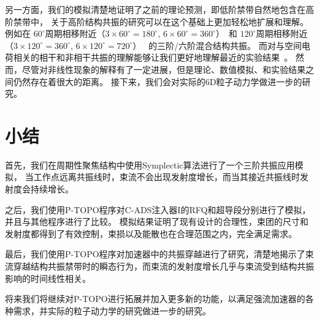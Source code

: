 另一方面，我们的模拟清楚地证明了之前的理论预测，即低阶禁带自然地包含在高阶禁带中，
关于高阶结构共振的研究可以在这个基础上更加轻松地扩展和理解。
例如在 $60^{\circ}$周期相移附近（$3 \times 60^{\circ} = 180^{\circ}$, $6 \times 60^{\circ} = 360^{\circ}$）~\cite{16}和 $120^{\circ}$周期相移附近（$3 \times 120^{\circ} = 360^{\circ}$, $6 \times 120^{\circ} = 720^{\circ}$）~\cite{11,36}
的三阶/六阶混合结构共振。
而对与空间电荷相关的相干和非相干共振的理解能够让我们更好地理解最近的实验结果~\cite{31,32,33}。
然而，尽管对非线性现象的解释有了一定进展，但是理论、数值模拟、和实验结果之间仍然存在着很大的距离。
接下来，我们会对实际的6D粒子动力学做进一步的研究。

\section{小结}                    \label{section:Simulation_conclusion}
首先，我们在周期性聚焦结构中使用Symplectic算法进行了一个三阶共振应用模拟，
当工作点远离共振线时，束流不会出现发射度增长，而当其接近共振线时发射度会持续增长。

之后，我们使用P-TOPO程序对C-ADS注入器I的RFQ和超导段分别进行了模拟，并且与其他程序进行了比较。
模拟结果证明了现有设计的合理性，束团的尺寸和发射度都得到了有效控制，束损以及能散也在合理范围之内，完全满足需求。

最后，我们使用P-TOPO程序对加速器中的共振穿越进行了研究，清楚地揭示了束流穿越结构共振禁带时的瞬态行为，而束流的发射度增长几乎与束流受到结构共振影响的时间线性相关。

将来我们将继续对P-TOPO进行拓展并加入更多新的功能，以满足强流加速器的各种需求，并实际的粒子动力学的研究做进一步的研究。